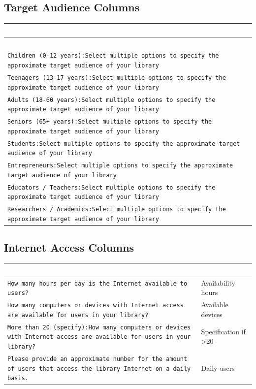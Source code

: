 \documentclass[11pt,a4paper]{article}
\begin{document}
\subsection{Target Audience Columns}

\begin{longtable}{|p{14cm}|}
\hline
\rowcolor{headerblue}\textcolor{white}{\textbf{Full Column Name}} \\
\hline
\endfirsthead
\hline
\rowcolor{headerblue}\textcolor{white}{\textbf{Full Column Name}} \\
\hline
\endhead
\texttt{Children (0-12 years):Select multiple options to specify the approximate target audience of your library} \\
\hline
\texttt{Teenagers (13-17 years):Select multiple options to specify the approximate target audience of your library} \\
\hline
\texttt{Adults (18-60 years):Select multiple options to specify the approximate target audience of your library} \\
\hline
\texttt{Seniors (65+ years):Select multiple options to specify the approximate target audience of your library} \\
\hline
\texttt{Students:Select multiple options to specify the approximate target audience of your library} \\
\hline
\texttt{Entrepreneurs:Select multiple options to specify the approximate target audience of your library} \\
\hline
\texttt{Educators / Teachers:Select multiple options to specify the approximate target audience of your library} \\
\hline
\texttt{Researchers / Academics:Select multiple options to specify the approximate target audience of your library} \\
\hline
\end{longtable}

\subsection{Internet Access Columns}

\begin{longtable}{|p{9cm}|p{5cm}|}
\hline
\rowcolor{headerblue}\textcolor{white}{\textbf{Column}} & \textcolor{white}{\textbf{Description}} \\
\hline
\texttt{How many hours per day is the Internet available to users?} & Availability hours \\
\hline
\texttt{How many computers or devices with Internet access are available for users in your library?} & Available devices \\
\hline
\texttt{More than 20 (specify):How many computers or devices with Internet access are available for users in your library?} & Specification if >20 \\
\hline
\texttt{Please provide an approximate number for the amount of users that access the library Internet on a daily basis.} & Daily users \\
\hline
\end{longtable}
\end{document}
